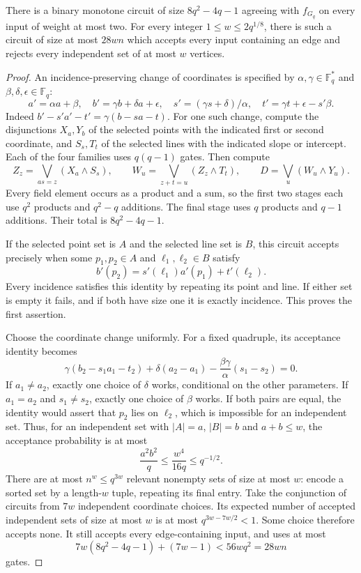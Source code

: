 \begin{theorem}\label{thm:weightbarrier}
There is a binary monotone circuit of size $8q^2-4q-1$ agreeing with $f_{G_q}$ on every input of weight at most two. For every integer $1\le w\le2q^{1/8}$, there is such a circuit of size at most $28wn$ which accepts every input containing an edge and rejects every independent set of at most $w$ vertices.
\end{theorem}
\begin{proof}
An incidence-preserving change of coordinates is specified by
$\alpha,\gamma\in\mathbb F_q^*$ and $\beta,\delta,\epsilon\in\mathbb F_q$:
\[
 a'=\alpha a+\beta,\quad b'=\gamma b+\delta a+\epsilon,
 \quad s'=(\gamma s+\delta)/\alpha,
 \quad t'=\gamma t+\epsilon-s'\beta.
\]
Indeed $b'-s'a'-t'=\gamma(b-sa-t)$.
For one such change, compute the disjunctions $X_a,Y_b$ of the selected points with the indicated first or second coordinate, and $S_s,T_t$ of the selected lines with the indicated slope or intercept. Each of the four families uses $q(q-1)$ gates. Then compute
\[
 Z_z=\bigvee_{as=z}(X_a\wedge S_s),\qquad
 W_u=\bigvee_{z+t=u}(Z_z\wedge T_t),\qquad
 D=\bigvee_u(W_u\wedge Y_u).
\]
Every field element occurs as a product and a sum, so the first two stages each use $q^2$ products and $q^2-q$ additions. The final stage uses $q$ products and $q-1$ additions. Their total is $8q^2-4q-1$.

If the selected point set is $A$ and the selected line set is $B$, this circuit accepts precisely when some $p_1,p_2\in A$ and $\ell_1,\ell_2\in B$ satisfy
\[
 b'(p_2)=s'(\ell_1)a'(p_1)+t'(\ell_2).
\]
Every incidence satisfies this identity by repeating its point and line. If either set is empty it fails, and if both have size one it is exactly incidence. This proves the first assertion.

Choose the coordinate change uniformly. For a fixed quadruple, its acceptance identity becomes
\[
 \gamma(b_2-s_1a_1-t_2)+\delta(a_2-a_1)
       -\frac{\beta\gamma}{\alpha}(s_1-s_2)=0.
\]
If $a_1\ne a_2$, exactly one choice of $\delta$ works, conditional on the other parameters. If $a_1=a_2$ and $s_1\ne s_2$, exactly one choice of $\beta$ works. If both pairs are equal, the identity would assert that $p_2$ lies on $\ell_2$, which is impossible for an independent set. Thus, for an independent set with $|A|=a$, $|B|=b$ and $a+b\le w$, the acceptance probability is at most
\[
 \frac{a^2b^2}{q}\le\frac{w^4}{16q}\le q^{-1/2}.
\]
There are at most $n^w\le q^{3w}$ relevant nonempty sets of size at most $w$: encode a sorted set by a length-$w$ tuple, repeating its final entry. Take the conjunction of circuits from $7w$ independent coordinate choices. Its expected number of accepted independent sets of size at most $w$ is at most $q^{3w-7w/2}<1$. Some choice therefore accepts none. It still accepts every edge-containing input, and uses at most
\[
 7w(8q^2-4q-1)+(7w-1)<56wq^2=28wn
\]
gates.
\end{proof}

